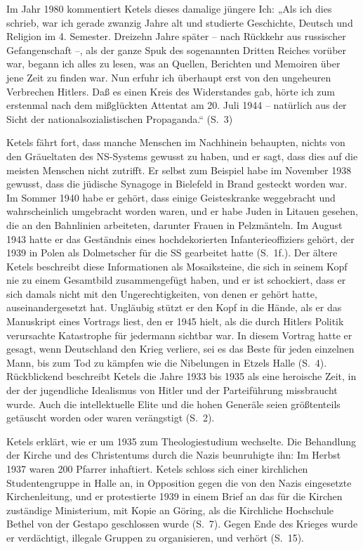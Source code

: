 \begin{multicols*}{2}
Im Jahr 1980 kommentiert Ketels dieses damalige jüngere Ich: „Als ich dies schrieb, war ich gerade zwanzig Jahre alt und studierte Geschichte, Deutsch und Religion im 4. Semester. Dreizehn Jahre später – nach Rückkehr aus russischer Gefangenschaft –, als der ganze Spuk des sogenannten Dritten Reiches vorüber war, begann ich alles zu lesen, was an Quellen, Berichten und Memoiren über jene Zeit zu finden war. Nun erfuhr ich überhaupt erst von den ungeheuren Verbrechen Hitlers. Daß es einen Kreis des Widerstandes gab, hörte ich zum erstenmal nach dem mißglückten Attentat am 20. Juli 1944 – natürlich aus der Sicht der nationalsozialistischen Propaganda.“ (S. 3)

Ketels fährt fort, dass manche Menschen im Nachhinein behaupten, nichts von den Gräueltaten des NS-Systems gewusst zu haben, und er sagt, dass dies auf die meisten Menschen nicht zutrifft. Er selbst zum Beispiel habe im November 1938 gewusst, dass die jüdische Synagoge in Bielefeld in Brand gesteckt worden war. Im Sommer 1940 habe er gehört, dass einige Geisteskranke weggebracht und wahrscheinlich umgebracht worden waren, und er habe Juden in Litauen gesehen, die an den Bahnlinien arbeiteten, darunter Frauen in Pelzmänteln. Im August 1943 hatte er das Geständnis eines hochdekorierten Infanterieoffiziers gehört, der 1939 in Polen als Dolmetscher für die SS gearbeitet hatte (S. 1f.). Der ältere Ketels beschreibt diese Informationen als Mosaiksteine, die sich in seinem Kopf nie zu einem Gesamtbild zusammengefügt haben, und er ist schockiert, dass er sich damals nicht mit den Ungerechtigkeiten, von denen er gehört hatte, auseinandergesetzt hat. Ungläubig stützt er den Kopf in die Hände, als er das Manuskript eines Vortrags liest, den er 1945 hielt, als die durch Hitlers Politik verursachte Katastrophe für jedermann sichtbar war. In diesem Vortrag hatte er gesagt, wenn Deutschland den Krieg verliere, sei es das Beste für jeden einzelnen Mann, bis zum Tod zu kämpfen wie die Nibelungen in Etzels Halle (S. 4). Rückblickend beschreibt Ketels die Jahre 1933 bis 1935 als eine heroische Zeit, in der der jugendliche Idealismus von Hitler und der Parteiführung missbraucht wurde. Auch die intellektuelle Elite und die hohen Generäle seien größtenteils getäuscht worden oder waren verängstigt (S. 2).

Ketels erklärt, wie er um 1935 zum Theologiestudium wechselte. Die Behandlung der Kirche und des Christentums durch die Nazis beunruhigte ihn: Im Herbst 1937 waren 200 Pfarrer inhaftiert. Ketels schloss sich einer kirchlichen Studentengruppe in Halle an, in Opposition gegen die von den Nazis eingesetzte Kirchenleitung, und er protestierte 1939 in einem Brief an das für die Kirchen zuständige Ministerium, mit Kopie an Göring, als die Kirchliche Hochschule Bethel von der Gestapo geschlossen wurde (S. 7). Gegen Ende des Krieges wurde er verdächtigt, illegale Gruppen zu organisieren, und verhört (S. 15).


\end{multicols*}
